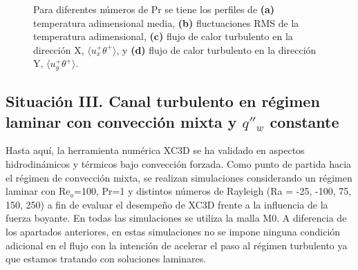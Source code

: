\begin{figure}[H]
 \caption{Para diferentes números de Pr se tiene los perfiles de \textbf{(a)} temperatura adimensional media, \textbf{(b)} fluctuaciones RMS de la temperatura adimensional, \textbf{(c)} flujo de calor turbulento en la dirección X, $\langle u^+_x \theta^+ \rangle$, y \textbf{(d)} flujo de calor turbulento en la dirección Y, $\langle u^+_y \theta^+ \rangle$.} 
 \label{fig:kpr_1}
\end{figure}


\subsection{Situación III. Canal turbulento en régimen laminar con convección mixta y $q''_w$ constante} \label{sec:mix-laminar}

Hasta aquí, la herramienta numérica XC3D se ha validado en aspectos hidrodinámicos y térmicos bajo convección forzada. Como punto de partida hacia el régimen de convección mixta, se realizan simulaciones considerando un régimen laminar con Re$_o$=100, Pr=1 y distintos números de Rayleigh (Ra = -25, -100, 75, 150, 250) a fin de evaluar el desempeño de XC3D frente a la influencia de la fuerza boyante. En todas las simulaciones se utiliza la malla M0. A diferencia de los apartados anteriores, en estas simulaciones no se impone ninguna condición adicional en el flujo con la intención de acelerar el paso al régimen turbulento ya que estamos tratando con soluciones laminares.


